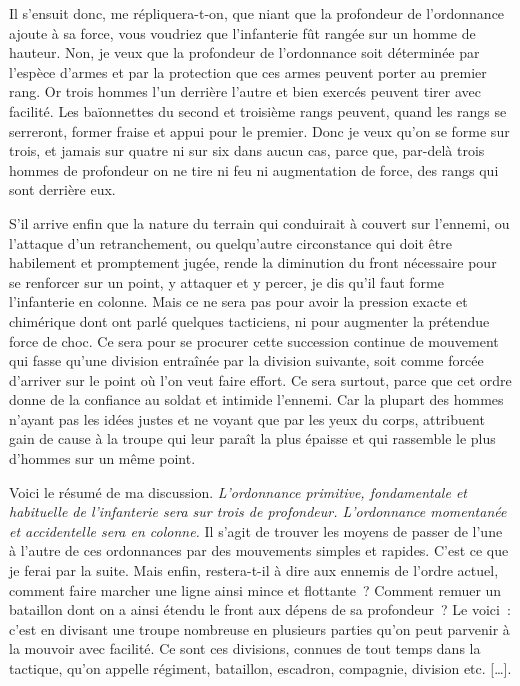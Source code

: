 \documentclass[french,twoside]{book} %
\begin{document}
Il s’ensuit donc, me répliquera-t-on, que niant que la profondeur de l’ordonnance ajoute à sa force, vous voudriez que l’infanterie fût rangée sur un homme de hauteur. Non, je veux que la profondeur de l’ordonnance soit déterminée par l’espèce d’armes et par la protection que ces armes peuvent porter au premier rang. Or trois hommes l’un derrière l’autre et bien exercés peuvent tirer avec facilité. Les baïonnettes du second et troisième rangs peuvent, quand les rangs se serreront, former fraise et appui pour le premier. Donc je veux qu’on se forme sur trois, et jamais sur quatre ni sur six dans aucun cas, parce que, par-delà trois hommes de profondeur on ne tire ni feu ni augmentation de force, des rangs qui sont derrière eux.\par
S’il arrive enfin que la nature du terrain qui conduirait à couvert sur l’ennemi, ou l’attaque d’un retranchement, ou quelqu’autre circonstance qui doit être habilement et promptement jugée, rende la diminution du front nécessaire pour se renforcer sur un point, y attaquer et y percer, je dis qu’il faut forme l’infanterie en colonne. Mais ce ne sera pas pour avoir la pression exacte et chimérique dont ont parlé quelques tacticiens, ni pour augmenter la prétendue force de choc. Ce sera pour se procurer cette succession continue de mouvement qui fasse qu’une division entraînée par la division suivante, soit comme forcée d’arriver sur le point où l’on veut faire effort. Ce sera surtout, parce que cet ordre donne de la confiance au soldat et intimide l’ennemi. Car la plupart des hommes n’ayant pas les idées justes et ne voyant que par les yeux du corps, attribuent gain de cause à la troupe qui leur paraît la plus épaisse et qui rassemble le plus d’hommes sur un même point.\par
Voici le résumé de ma discussion. {\itshape L’ordonnance primitive, fondamentale et habituelle de l’infanterie sera sur trois de profondeur. L’ordonnance momentanée et accidentelle sera en colonne.} Il s’agit de trouver les moyens de passer de l’une à l’autre de ces ordonnances par des mouvements simples et rapides. C’est ce que je ferai par la suite. Mais enfin, restera-t-il à dire aux ennemis de l’ordre actuel, comment faire marcher une ligne ainsi mince et flottante ? Comment remuer un bataillon dont on a ainsi étendu le front aux dépens de sa profondeur ? Le voici : c’est en divisant une troupe nombreuse en plusieurs parties qu’on peut parvenir à la mouvoir avec facilité. Ce sont ces divisions, connues de tout temps dans la tactique, qu’on appelle régiment, bataillon, escadron, compagnie, division etc. […].\par
\end{document}
